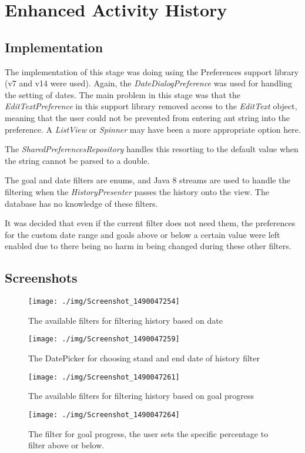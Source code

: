 \documentclass[report.tex]{subfiles}
\begin{document}
\section{Enhanced Activity History} %
\label{sec:enhanced_activity_history}
\subsection{Implementation} %
\label{sub:implementation_5}
The implementation of this stage was doing using the Preferences support library
(v7 and v14 were used). Again, the \emph{DateDialogPreference} was used for
handling the setting of dates. The main problem in this stage was that the
\emph{EditTextPreference} in this support library removed access to the
\emph{EditText} object, meaning that the user could not be prevented from
entering ant string into the preference. A \emph{ListView} or \emph{Spinner} may
have been a more appropriate option here.

 The \emph{SharedPreferencesRepository}
handles this resorting to the default value when the string cannot be parsed to
a double.

The goal and date filters are enums, and Java 8 streams are used to handle the
filtering when the \emph{HistoryPresenter} passes the history onto the view. The
database has no knowledge of these filters.

It was decided that even if the current filter does not need them, the
preferences for the custom date range and goals above or below a certain value
were left enabled due to there being no harm in being changed during these
other filters.

\subsection{Screenshots} %
\label{sub:screenshots_5}
\begin{figure}[H]
    \centering
    \texttt{[image: ./img/Screenshot\_1490047254]}
    \caption{The available filters for filtering history based on date}
\end{figure}

\begin{figure}[H]
    \centering
    \texttt{[image: ./img/Screenshot\_1490047259]}
    \caption{The DatePicker for choosing stand and end date of history filter}
\end{figure}

\begin{figure}[H]
    \centering
    \texttt{[image: ./img/Screenshot\_1490047261]}
    \caption{The available filters for filtering history based on goal progress}
\end{figure}

\begin{figure}[H]
    \centering
    \texttt{[image: ./img/Screenshot\_1490047264]}
    \caption{The filter for goal progress, the user sets the specific percentage
    to filter above or below.}
\end{figure}

\newpage
\end{document}
